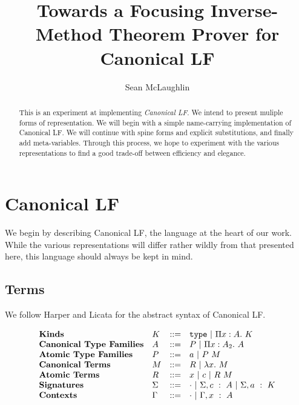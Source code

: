 \documentclass[11pt,twoside]{article}
\title{Towards a Focusing Inverse-Method Theorem Prover for Canonical LF}
\author{Sean McLaughlin}
\begin{document}
 
\maketitle

\arraycolsep=12pt


\begin{abstract} 
This is an experiment at implementing \emph{Canonical LF}.  We intend
to present muliple forms of representation.  We will begin with a
simple name-carrying implementation of Canonical LF.  We will continue
with spine forms and explicit substitutions, and finally add
meta-variables.  Through this process, we hope to experiment with the
various representations to find a good trade-off between efficiency
and elegance.
\end{abstract} 


\section{Canonical LF}
We begin by describing Canonical LF, the language at the
heart of our work.  While the various representations will
differ rather wildly from that presented here, this language
should always be kept in mind.

\subsection{Terms}\label{CLF:types}  
  We follow Harper and Licata \cite{HarperLicataCLF} for the
abstract syntax of Canonical LF. 

$$
\begin{array}{llll}
\textbf{Kinds} & K & ::= & \mathtt{type} \ |\  \Pi x : A.\ K \\
\textbf{Canonical Type Families} & A & ::= & P \ |\  \Pi x : A_2.\ A \\
\textbf{Atomic Type Families} & P & ::= & a \ |\  P\ M \\
\textbf{Canonical Terms} & M & ::= & R \ |\  \lambda x.\ M \\
\textbf{Atomic Terms} & R & ::= &  x \ |\  c \ |\  R\ M\\
\textbf{Signatures} & \Sigma & ::= & \cdot \ |\  \Sigma,c\ :\ A 
\ |\  \Sigma,a\ :\ K\\
\textbf{Contexts} & \Gamma & ::= & \cdot \ |\  \Gamma,x\ :\ A\\
\end{array}
$$
\end{document}
